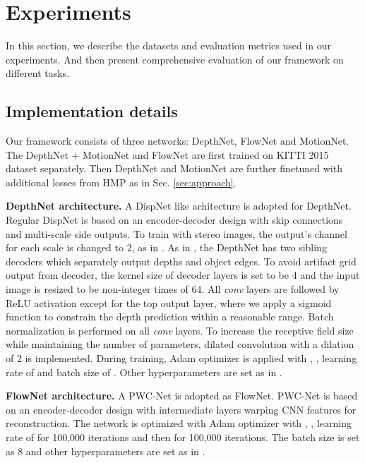 \documentclass[runningheads]{llncs}
\begin{document}
 
\vspace{-0.5\baselineskip}
\section{Experiments}
\vspace{-0.5\baselineskip}
\label{sec:exp}

In this section, we describe the datasets and evaluation metrics used in our experiments. And then present comprehensive evaluation of our framework on different tasks. 

\vspace{-0.3\baselineskip}
\subsection{Implementation details}
\vspace{-0.3\baselineskip}
Our framework consists of three networks: DepthNet, FlowNet and MotionNet. The DepthNet + MotionNet and FlowNet are first trained on KITTI 2015 dataset separately. Then DepthNet and MotionNet are further finetuned with additional losses from HMP as in Sec. \ref{sec:approach}.

\vspace{0.5\baselineskip}
\noindent\textbf{DepthNet architecture.}
A DispNet \cite{mayer2016large} like achitecture is adopted for DepthNet. Regular DispNet is based on an encoder-decoder design with skip connections and multi-scale side outputs. To train with stereo images, the output's channel for each scale is changed to 2, as in \cite{godard2016unsupervised}. As in \cite{yang2018cvpr}, the DepthNet has two sibling decoders which separately output depths and object edges. To avoid artifact grid output from decoder, the kernel size of decoder layers is set to be 4 and the input image is resized to be non-integer times of 64. All \textit{conv} layers are followed by ReLU activation except for the top output layer, where we apply a sigmoid function to constrain the depth prediction within a reasonable range. Batch normalization \cite{ioffe2015batch} is performed on all \textit{conv} layers. 
To increase the receptive field size while maintaining the number of parameters, dilated convolution with a dilation of 2 is implemented. 
During training, Adam optimizer \cite{kingma2014adam} is applied with , , learning rate of  and batch size of . Other hyperparameters are set as in \cite{yang2018cvpr}.

\vspace{0.5\baselineskip}
\noindent\textbf{FlowNet architecture.}
A PWC-Net \cite{sun2017pwc} is adopted as FlowNet. PWC-Net is based on an encoder-decoder design with intermediate layers warping CNN features for reconstruction. The network is optimized with Adam optimizer \cite{kingma2014adam} with , , learning rate of  for 100,000 iterations and then  for 100,000 iterations. The batch size is set as 8 and other hyperparameters are set as in \cite{wang2017occlusion}.
\end{document}

